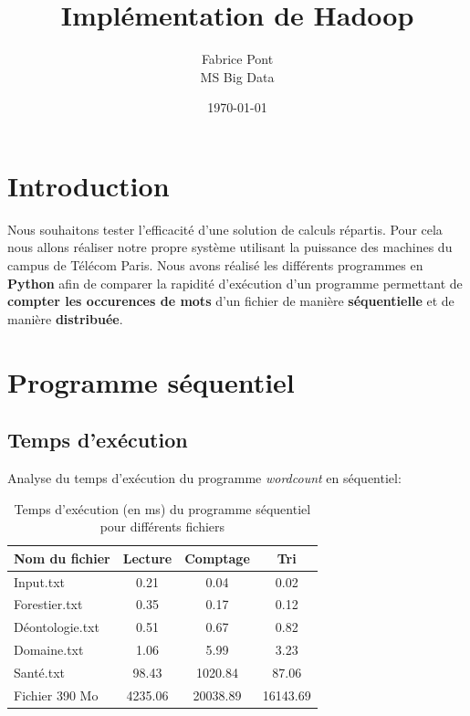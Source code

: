 \documentclass{article}
\title{Implémentation de Hadoop}
\author{Fabrice Pont \\ MS Big Data}
\date{\today}
\begin{document}
\maketitle

\section{Introduction}
Nous souhaitons tester l'efficacité d'une solution de calculs répartis. Pour cela nous allons réaliser notre propre système utilisant la puissance des machines du campus de
Télécom Paris. Nous avons réalisé les différents programmes en \textbf{Python} afin de comparer la rapidité d'exécution d'un programme permettant de \textbf{compter les occurences de mots} d'un fichier
de manière \textbf{séquentielle} et de manière \textbf{distribuée}.

\section{Programme séquentiel}
\subsection{Temps d'exécution}
Analyse du temps d'exécution du programme \textit{wordcount} en séquentiel:
\begin{table}[h!]
    \begin{center}
        \begin{tabular}{| l || c | c | c |}
            \hline			
              \textbf{Nom du fichier} & \textbf{Lecture} & \textbf{Comptage} & \textbf{Tri} \\ \hline \hline
              Input.txt & 0.21 & 0.04 & 0.02\\ \hline 
              Forestier.txt & 0.35 & 0.17 & 0.12\\ \hline
              Déontologie.txt & 0.51 & 0.67 & 0.82\\ \hline
              Domaine.txt & 1.06 & 5.99 & 3.23\\ \hline
              Santé.txt & 98.43 & 1020.84 & 87.06\\ \hline
              Fichier 390 Mo & 4235.06 & 20038.89 & 16143.69\\
            \hline  
        \end{tabular}
    \end{center}
    \caption{Temps d'exécution (en ms) du programme séquentiel pour différents fichiers }
\end{table}
\end{document}
